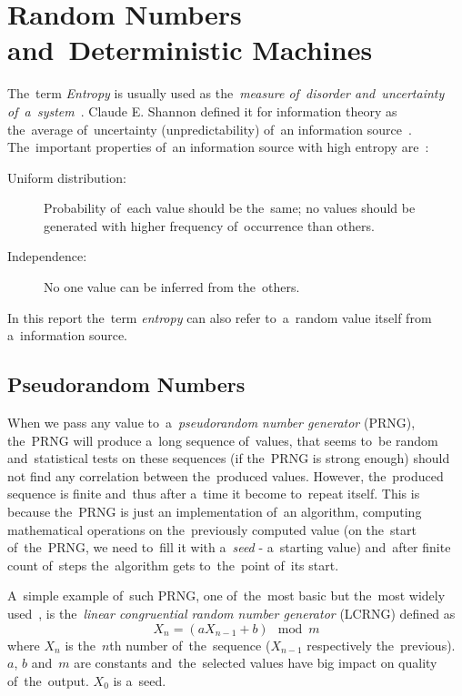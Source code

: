 \chapter{Random Numbers and~Deterministic Machines}\label{chap:randomNumbers}
\par{
The~term {\em Entropy} is usually used  as the~{\em measure of~disorder 
and~uncertainty of~a~system}~\cite{Entrophy}. Claude E. Shannon defined it 
for information theory as the~average of~uncertainty (unpredictability) 
of~an information source~\cite[p.~396]{AMathematicalTheoryOfCommunication}. 
The~important properties of~an information source with high entropy 
are~\cite[p.~150]{CryptographyAndNetworkSecurity}: 
\begin{description}
 \item [Uniform distribution:] Probability of~each value should be the~same; 
 no values should be generated with higher frequency of~occurrence than others.
 \item [Independence:] No one value can be inferred from the~others.
\end{description}
}

\par{
In this report the~term {\em entropy} can also refer to~a~random value itself 
from a~information source. 
}

\par{
\section{Pseudorandom Numbers}
When we pass any value to~a~{\em pseudorandom number generator} (PRNG), 
the~PRNG will produce a~long sequence of~values, that seems to~be random 
and~statistical tests on these sequences (if the~PRNG is strong enough) 
should not find any correlation between the~produced values. However, 
the~produced sequence is finite and~thus after a~time it become to~repeat itself. 
This is because the~PRNG is just an implementation of~an algorithm, computing 
mathematical operations on the~previously computed value (on the~start 
of~the~PRNG, we need to~fill it with a~{\em seed} - a~starting value) 
and~after finite count of~steps the~algorithm gets to~the~point of~its start.
}

\par{
A~simple example of~such PRNG, one of~the~most basic but the~most widely 
used~\cite[p.~151]{CryptographyAndNetworkSecurity}, 
is the~{\em linear congruential random number generator} (LCRNG) defined as 
\begin{equation}\label{eq:LCRNG}
  X_n = (aX_{n-1} + b) \mod{m}
\end{equation}
where $X_n$ is the~$n$th number of~the~sequence ($X_{n-1}$ respectively 
the~previous). $a$, $b$ and~$m$ are constants and~the~selected values 
have big impact on quality of~the~output. $X_0$ is a~seed. 
}

